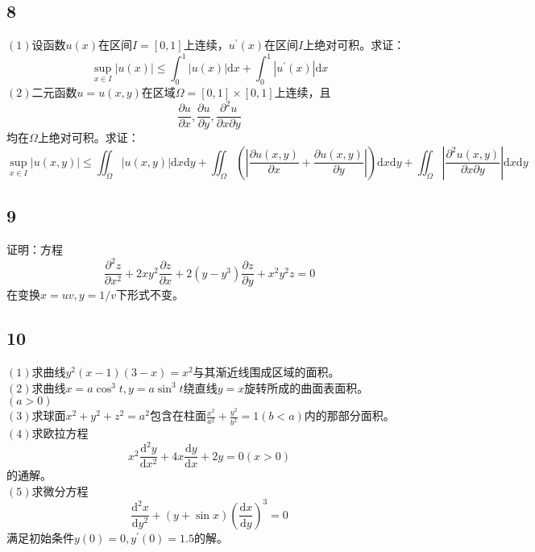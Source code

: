 \documentclass[a4paper,12pt]{article}
\begin{document}
\subsection*{8}\noindent$\left(1\right)$设函数$u\left(x\right)$在区间$I=[0,1]$上连续，$u^{\prime}\left(x\right)$在区间$I$上绝对可积。求证：
\begin{equation*}
	\sup\limits_{x\in I}\left|u\left(x\right)\right|\leq\int_{0}^{1}\left|u\left(x\right)\right|\mathrm{d}x+\int_{0}^{1}\left|u^{\prime}\left(x\right)\right|\mathrm{d}x
\end{equation*}
\noindent$\left(2\right)$二元函数$u=u\left(x,y\right)$在区域$\Omega=[0,1]\times[0,1]$上连续，且\begin{equation*}
	\frac{\partial u}{\partial x},\frac{\partial u}{\partial y},\frac{\partial^2 u}{\partial x\partial y}
\end{equation*}
均在$\Omega$上绝对可积。求证：
\begin{equation*}
	\sup\limits_{x\in I}\left|u\left(x,y\right)\right|\leq\iint_{\Omega}\left|u\left(x,y\right)\right|\mathrm{d}x\mathrm{d}y+\iint_{\Omega}\left(\left|\frac{\partial u\left(x,y\right)}{\partial x}+\frac{\partial u\left(x,y\right)}{\partial y}\right|\right)\mathrm{d}x\mathrm{d}y+\iint_{\Omega}\left|\frac{\partial^2 u\left(x,y\right)}{\partial x\partial y}\right|\mathrm{d}x\mathrm{d}y
\end{equation*}
\subsection*{9}\noindent 证明：方程
\begin{equation*}
	\frac{\partial^2 z}{\partial x^2}+2xy^2\frac{\partial z}{\partial x}+2\left(y-y^3\right)\frac{\partial z}{\partial y}+x^{2}y^{2}z=0
\end{equation*}
在变换$x=uv,y=1/v$下形式不变。
\subsection*{10}\noindent$\left(1\right)$求曲线$y^2\left(x-1\right)\left(3-x\right)=x^2$与其渐近线围成区域的面积。\\
\noindent$\left(2\right)$求曲线$x=a\cos^3t,y=a\sin^3t$绕直线$y=x$旋转所成的曲面表面积。$\left(a>0\right)$\\
\noindent$\left(3\right)$求球面$x^2+y^2+z^2=a^2$包含在柱面$\frac{x^2}{a^2}+\frac{y^2}{b^2}=1\left(b<a\right)$内的那部分面积。\\
\noindent$\left(4\right)$求欧拉方程\begin{equation*}
	x^2\frac{\mathrm{d}^2 y}{\mathrm{d}x^2}+4x\frac{\mathrm{d}y}{\mathrm{d}x}+2y=0\left(x>0\right)
\end{equation*}
的通解。\\
\noindent$\left(5\right)$求微分方程\begin{equation*}
	\frac{\mathrm{d}^2 x}{\mathrm{d} y^2}+\left(y+\sin x\right)\left(\frac{\mathrm{d}x}{\mathrm{d}y}\right)^3=0
\end{equation*}
满足初始条件$y\left(0\right)=0,y^{\prime}\left(0\right)=1.5$的解。
\end{document}

